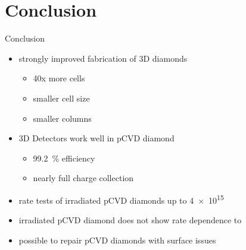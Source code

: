 \section{Conclusion}
\begin{frame}{Conclusion}

	\begin{minipage}[c][5cm]{\textwidth}
		\begin{itemize}\itemfill
			\item strongly improved fabrication of 3D diamonds
			\begin{itemize}
				\item 40x more cells
				\item smaller cell size
				\item smaller columns\vspace*{5pt}
			\end{itemize}
			\item 3D Detectors work well in pCVD diamond
			\begin{itemize}
				\item \SI{99.2}{\%} efficiency
				\item nearly full charge collection\vspace*{5pt}
			\end{itemize}
			\item rate tests of irradiated pCVD diamonds up to \SI{4e15}{\ncm}
			\item irradiated pCVD diamond does not show rate dependence to  
			\item possible to repair pCVD diamonds with surface issues
		\end{itemize}
	\end{minipage}
	
\end{frame}
